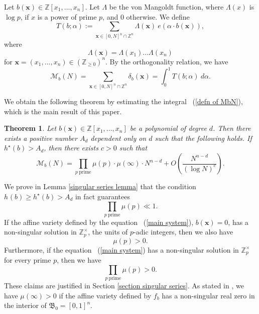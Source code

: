 \documentclass[12pt]{amsart}
\newtheorem{thm}{Theorem}[section]
\theoremstyle{definition}
\theoremstyle{remark}
\numberwithin{equation}{section}
\begin{document}
Let $b(\mathbf{x}) \in \mathbb{Z}[x_1,..., x_n]$. Let $\Lambda$ be the von Mangoldt function, where
$\Lambda(x)$ is $\log p$, if $x$ is a power of prime $p$, and $0$ otherwise.
We define
\begin{equation}
\label{def of exp sum T}
T(b; \alpha) := \sum_{\mathbf{x} \in [0, N]^n \cap \mathbb{Z}^n} \Lambda(\mathbf{x}) \ e( \alpha \cdot b(\mathbf{x})),
\end{equation}
where
$$
\Lambda(\mathbf{x}) = \Lambda(x_1) ... \Lambda(x_n)
$$
for $\mathbf{x} = (x_1, ... , x_n) \in (\mathbb{Z}_{\geq 0})^n$.
By the orthogonality relation, we have
\begin{equation}
\label{defn of MbN}
\mathcal{M}_{b}(N) = \sum_{\mathbf{x} \in [0, N]^n \cap \mathbb{Z}^n} \delta_b(\mathbf{x} ) = \int_0^1 T(b; \alpha) \ d\alpha. 
\end{equation}
\iffalse
where
\begin{eqnarray}
\notag
\delta_b(\mathbf{x} ) =
\left\{
    \begin{array}{ll}
         \prod_{1 \leq i \leq n} \log p_i,
         &\mbox{if } x_i = p_i^{t_i}, p_i \mbox{ is prime }(1 \leq i \leq n), \mbox{ and } b(\mathbf{x}) = 0,\\
         0,
         &\mbox{otherwise }.
    \end{array}
\right.
\end{eqnarray}
\fi
We obtain the following theorem by estimating the integral ~(\ref{defn of MbN}), which is the main result of this paper.
\begin{thm}
\label{the main theorem}
Let $b(\mathbf{x}) \in \mathbb{Z}[x_1, ..., x_n]$ be a polynomial of degree $d$.
Then there exists a positive number $A_{d}$ dependent only on $d$ such that the following holds.
If $h^{\star}(b) > A_d$, then there exists $c>0$ such that
$$
\mathcal{M}_{b}(N) =  \prod_{p \ \text{prime}} \mu(p) \cdot  \mu(\infty) \cdot N^{n-d} + O\left( \frac{N^{n-d}}{(\log N)^{c} } \right).
$$
\end{thm}

We prove in Lemma \ref{singular series lemma} that the condition $h^{}(b) \geq  h^{\star}({b}) > A_{d}$ in fact guarantees
$$
\prod_{p \ \text{prime}} \mu(p) \ll 1.
$$
If the affine variety defined by the equation ~(\ref{main system}), $b(\mathbf{x}) =0$,  has a non-singular solution in $\mathbb{Z}_p^{\times}$, the units of $p$-adic integers, then we also have
$$
\mu(p) > 0.
$$
Furthermore, if the equation ~(\ref{main system}) has a non-singular solution in $\mathbb{Z}_p^{\times}$ for every prime $p$, then we have
$$
\prod_{p \ \text{prime}} \mu(p) > 0.
$$
These claims are justified in Section \ref{section singular series}.
As stated in \cite[pp. 704]{CM}, we have $\mu(\infty) > 0$ if the affine variety defined by $f_b$ has a
non-singular real zero in the interior of $\mathfrak{B}_0 = [0,1]^n$.
\end{document}
